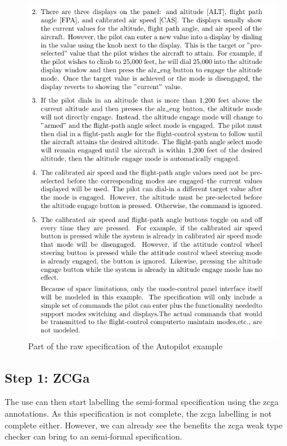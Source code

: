 \begin{figure}[H]
\begin{minipage}{0.45\textwidth}
    \includegraphics[width=\textwidth]{Figures/fullexample/0auto2.png}
    \end{minipage}
    \caption{Part of the raw specification of the Autopilot example \label{fig:rawautocomp}}
    \end{figure}



 \subsection{Step 1: ZCGa}

 The use can then start labelling the semi-formal specification using the
 \gls{zcga} annotations. As this specification is not complete, the \gls{zcga}
 labelling is not complete either. However, we can already see the benefits the
 \gls{zcga} weak type checker can bring to an semi-formal specification.


